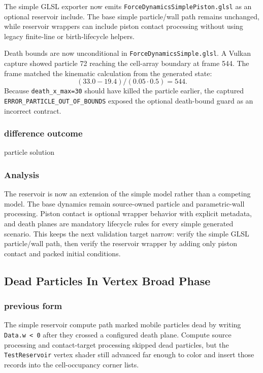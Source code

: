 The simple GLSL exporter now emits
\texttt{ForceDynamicsSimplePiston.glsl} as an optional reservoir include.
The base simple particle/wall path remains unchanged, while reservoir wrappers
can include piston contact processing without using legacy finite-line or
birth-lifecycle helpers.

Death bounds are now unconditional in
\texttt{ForceDynamicsSimple.glsl}.  A Vulkan capture showed particle 72
reaching the cell-array boundary at frame 544.  The frame matched the
kinematic calculation from the generated state:
\[
(33.0-19.4)/(0.05\cdot0.5)=544.
\]
Because \texttt{death\_x\_max=30} should have killed the particle earlier,
the captured \texttt{ERROR\_PARTICLE\_OUT\_OF\_BOUNDS} exposed the optional
death-bound guard as an incorrect contract.

\subsubsection{difference outcome}

particle solution

\subsubsection{Analysis}

The reservoir is now an extension of the simple model rather than a competing
model.  The base dynamics remain source-owned particle and parametric-wall
processing.  Piston contact is optional wrapper behavior with explicit
metadata, and death planes are mandatory lifecycle rules for every simple
generated scenario.  This keeps the next validation target narrow: verify the
simple GLSL particle/wall path, then verify the reservoir wrapper by adding
only piston contact and packed initial conditions.

\subsection{Dead Particles In Vertex Broad Phase}

\subsubsection{previous form}

The simple reservoir compute path marked mobile particles dead by writing
\texttt{Data.w < 0} after they crossed a configured death plane.  Compute
source processing and contact-target processing skipped dead particles, but
the \texttt{TestReservoir} vertex shader still advanced far enough to color
and insert those records into the cell-occupancy corner lists.

